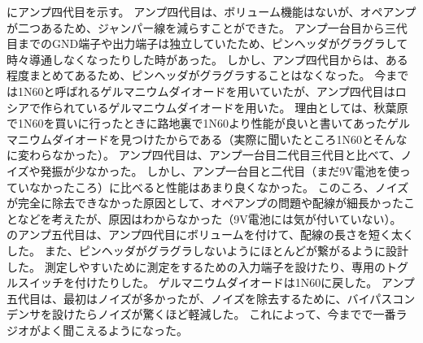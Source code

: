 \documentclass[report.tex]{subfiles}
\begin{document}
にアンプ四代目を示す。
アンプ四代目は、ボリューム機能はないが、オペアンプが二つあるため、ジャンパー線を減らすことができた。
アンプ一台目から三代目までのGND端子や出力端子は独立していたため、ピンヘッダがグラグラして時々導通しなくなったりした時があった。
しかし、アンプ四代目からは、ある程度まとめてあるため、ピンヘッダがグラグラすることはなくなった。
今までは1N60と呼ばれるゲルマニウムダイオードを用いていたが、アンプ四代目はロシアで作られているゲルマニウムダイオードを用いた。
理由としては、秋葉原で1N60を買いに行ったときに路地裏で1N60より性能が良いと書いてあったゲルマニウムダイオードを見つけたからである（実際に聞いたところ1N60とそんなに変わらなかった）。
アンプ四代目は、アンプ一台目二代目三代目と比べて、ノイズや発振が少なかった。
しかし、アンプ一台目と二代目（まだ9V電池を使っていなかったころ）に比べると性能はあまり良くなかった。
このころ、ノイズが完全に除去できなかった原因として、オペアンプの問題や配線が細長かったことなどを考えたが、原因はわからなかった（9V電池には気が付いていない）。
のアンプ五代目は、アンプ四代目にボリュームを付けて、配線の長さを短く太くした。
また、ピンヘッダがグラグラしないようにほとんどが繋がるように設計した。
測定しやすいために測定をするための入力端子を設けたり、専用のトグルスイッチを付けたりした。
ゲルマニウムダイオードは1N60に戻した。
アンプ五代目は、最初はノイズが多かったが、ノイズを除去するために、バイパスコンデンサを設けたらノイズが驚くほど軽減した。
これによって、今までで一番ラジオがよく聞こえるようになった。
\end{document}
